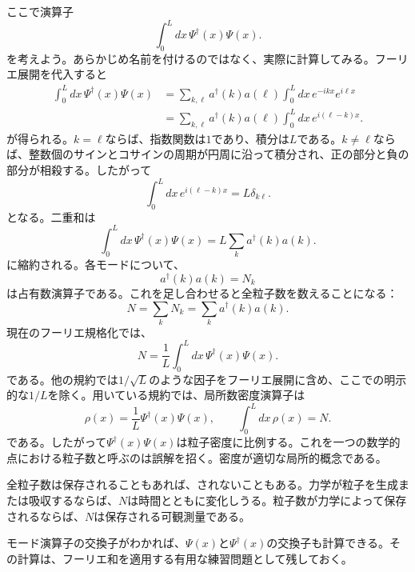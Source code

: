 ここで演算子
\begin{equation}
\int_0^L dx\,\Psi^\dagger(x)\Psi(x).
\end{equation}
を考えよう。あらかじめ名前を付けるのではなく、実際に計算してみる。フーリエ展開を代入すると
\begin{align}
\int_0^L dx\,\Psi^\dagger(x)\Psi(x)
&=
\sum_{k,\ell}a^\dagger(k)a(\ell)
\int_0^L dx\,e^{-ikx}e^{i\ell x}
\\
&=
\sum_{k,\ell}a^\dagger(k)a(\ell)
\int_0^L dx\,e^{i(\ell-k)x}.
\end{align}
が得られる。\(k=\ell\)ならば、指数関数は\(1\)であり、積分は\(L\)である。\(k\ne\ell\)ならば、整数個のサインとコサインの周期が円周に沿って積分され、正の部分と負の部分が相殺する。したがって
\begin{equation}
\int_0^L dx\,e^{i(\ell-k)x}=L\delta_{k\ell}.
\end{equation}
となる。二重和は
\begin{equation}
\int_0^L dx\,\Psi^\dagger(x)\Psi(x)
=L\sum_k a^\dagger(k)a(k).
\end{equation}
に縮約される。各モードについて、
\begin{equation}
a^\dagger(k)a(k)=N_k
\end{equation}
は占有数演算子である。これを足し合わせると全粒子数を数えることになる：
\begin{equation}
N=\sum_k N_k=\sum_k a^\dagger(k)a(k).
\end{equation}
現在のフーリエ規格化では、
\begin{equation}
N=\frac{1}{L}\int_0^L dx\,
\Psi^\dagger(x)\Psi(x).
\end{equation}
である。他の規約では\(1/\sqrt{L}\)のような因子をフーリエ展開に含め、ここでの明示的な\(1/L\)を除く。用いている規約では、局所数密度演算子は
\begin{equation}
\rho(x)=\frac{1}{L}\Psi^\dagger(x)\Psi(x),
\qquad
\int_0^L dx\,\rho(x)=N.
\end{equation}
である。したがって\(\Psi^\dagger(x)\Psi(x)\)は粒子密度に比例する。これを一つの数学的点における粒子数と呼ぶのは誤解を招く。密度が適切な局所的概念である。

全粒子数は保存されることもあれば、されないこともある。力学が粒子を生成または吸収するならば、\(N\)は時間とともに変化しうる。粒子数が力学によって保存されるならば、\(N\)は保存される可観測量である。

モード演算子の交換子がわかれば、\(\Psi(x)\)と\(\Psi^\dagger(x)\)の交換子も計算できる。その計算は、フーリエ和を適用する有用な練習問題として残しておく。

